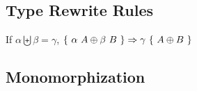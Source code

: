\documentclass{article}
\begin{document}
\subsection{Type Rewrite Rules}

If $\alpha \biguplus \beta = \gamma$, $\{~ \alpha~A \oplus \beta~B ~\} \Rightarrow \gamma~\{~ A \oplus B ~\}$

\subsection{Monomorphization}


\end{document}
